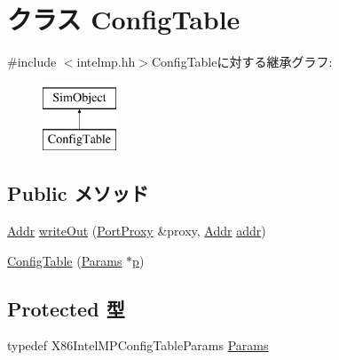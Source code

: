 \hypertarget{classX86ISA_1_1IntelMP_1_1ConfigTable}{
\section{クラス ConfigTable}
\label{classX86ISA_1_1IntelMP_1_1ConfigTable}
}


{\ttfamily \#include $<$intelmp.hh$>$}ConfigTableに対する継承グラフ:\begin{figure}[H]
\begin{center}
\leavevmode
\includegraphics[height=2cm]{classX86ISA_1_1IntelMP_1_1ConfigTable}
\end{center}
\end{figure}
\subsection*{Public メソッド}
\begin{DoxyCompactItemize}
\item 
\hyperlink{base_2types_8hh_af1bb03d6a4ee096394a6749f0a169232}{Addr} \hyperlink{classX86ISA_1_1IntelMP_1_1ConfigTable_ad41fd44625bfa1495c2d729037dbf863}{writeOut} (\hyperlink{classPortProxy}{PortProxy} \&proxy, \hyperlink{base_2types_8hh_af1bb03d6a4ee096394a6749f0a169232}{Addr} \hyperlink{namespaceX86ISA_ab705917f60c5566f9ce56a93f798b2e2}{addr})
\item 
\hyperlink{classX86ISA_1_1IntelMP_1_1ConfigTable_ae6957ab4975a9b0764b115d22df8797e}{ConfigTable} (\hyperlink{classX86ISA_1_1IntelMP_1_1ConfigTable_a81c2fec34671b0bd0fbd621940d92d0e}{Params} $\ast$\hyperlink{namespaceX86ISA_af675c1d542a25b96e11164b80809a856}{p})
\end{DoxyCompactItemize}
\subsection*{Protected 型}
\begin{DoxyCompactItemize}
\item 
typedef X86IntelMPConfigTableParams \hyperlink{classX86ISA_1_1IntelMP_1_1ConfigTable_a81c2fec34671b0bd0fbd621940d92d0e}{Params}
\end{DoxyCompactItemize}
